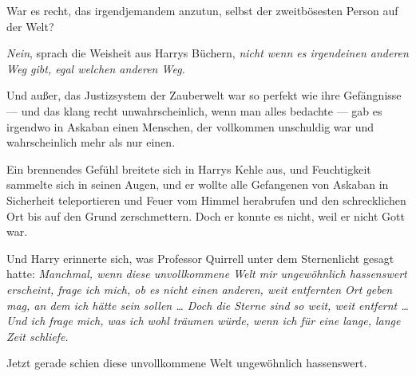 War es recht, das irgendjemandem anzutun, selbst der zweitbösesten Person auf der Welt?

\emph{Nein}, sprach die Weisheit aus Harrys Büchern, \emph{nicht wenn es irgendeinen anderen Weg gibt, egal welchen anderen Weg.}

Und außer, das Justizsystem der Zauberwelt war so perfekt wie ihre Gefängnisse — und das klang recht unwahrscheinlich, wenn man alles bedachte — gab es irgendwo in Askaban einen Menschen, der vollkommen unschuldig war und wahrscheinlich mehr als nur einen.

Ein brennendes Gefühl breitete sich in Harrys Kehle aus, und Feuchtigkeit sammelte sich in seinen Augen, und er wollte alle Gefangenen von Askaban in Sicherheit teleportieren und Feuer vom Himmel herabrufen und den schrecklichen Ort bis auf den Grund zerschmettern. Doch er konnte es nicht, weil er nicht Gott war.

Und Harry erinnerte sich, was Professor Quirrell unter dem Sternenlicht gesagt hatte: \emph{Manchmal, wenn diese unvollkommene Welt mir ungewöhnlich hassenswert erscheint, frage ich mich, ob es nicht einen anderen, weit entfernten Ort geben mag, an dem ich hätte sein sollen … Doch die Sterne sind so weit, weit entfernt … Und ich frage mich, was ich wohl träumen würde, wenn ich für eine lange, lange Zeit schliefe.}

Jetzt gerade schien diese unvollkommene Welt ungewöhnlich hassenswert.

